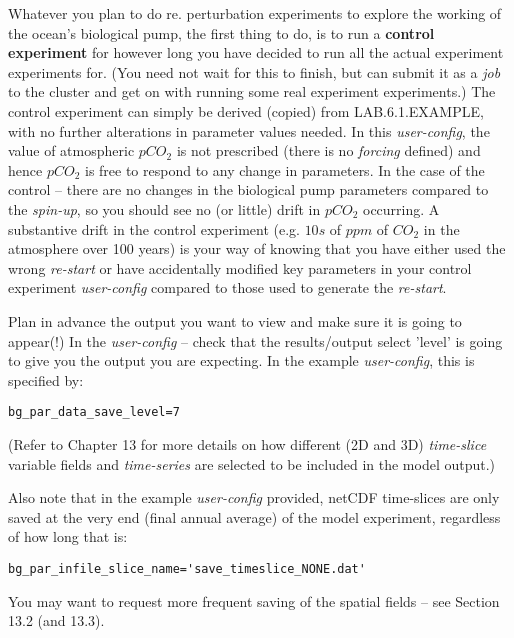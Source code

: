 \vspace{1mm}

Whatever you plan to do re. perturbation experiments to explore the working of the ocean's biological pump, the first thing to do, is to run a \textbf{control experiment} for however long you have decided to run all the actual experiment experiments for. (You need not wait for this to finish, but can submit it as a \textit{job} to the cluster and get on with running some real experiment experiments.) The control experiment can simply be derived (copied) from \textsf{\footnotesize LAB.6.1.EXAMPLE}, with no further alterations in parameter values needed. In this \textit{user-config}, the value of atmospheric  \(pCO_{2}\) is not prescribed (there is no \textit{forcing} defined) and hence \(pCO_{2}\) is free to respond to any change in parameters. In the case of the control -- there are no changes in the biological pump parameters compared to the \textit{spin-up}, so you should see no (or little) drift in \(pCO_{2}\) occurring. 
A substantive drift in the control experiment (e.g. \(10s\) of \(ppm\) of \(CO_{2}\) in the atmosphere over 100 years) is your way of knowing that you have either used the wrong \textit{re-start} or have accidentally modified key parameters in your control experiment \textit{user-config} compared to those used to generate the \textit{re-start}.

\vspace{1mm}
Plan in advance  the output you want to view and make sure it is going to appear(!) In the \textit{user-config} -- check that the results/output select 'level' is going to give you the output you are expecting. In the example \textit{user-config}, this is specified by:
\vspace{-1mm}\small\begin{verbatim}
bg_par_data_save_level=7
\end{verbatim}\normalsize\vspace{-1mm}
(Refer to Chapter 13 for more details on how different (2D and 3D) \textit{time-slice} variable fields and \textit{time-series} are selected to be included in the model output.)

\vspace{1mm}
Also note that in the example \textit{user-config} provided, netCDF time-slices are only saved at the very end (final annual average) of the model experiment, regardless of how long that is:
\vspace{-1mm}\small\begin{verbatim}
bg_par_infile_slice_name='save_timeslice_NONE.dat'
\end{verbatim}\normalsize\vspace{-1mm}
You may want to request more frequent saving of the spatial fields -- see Section 13.2 (and 13.3).

